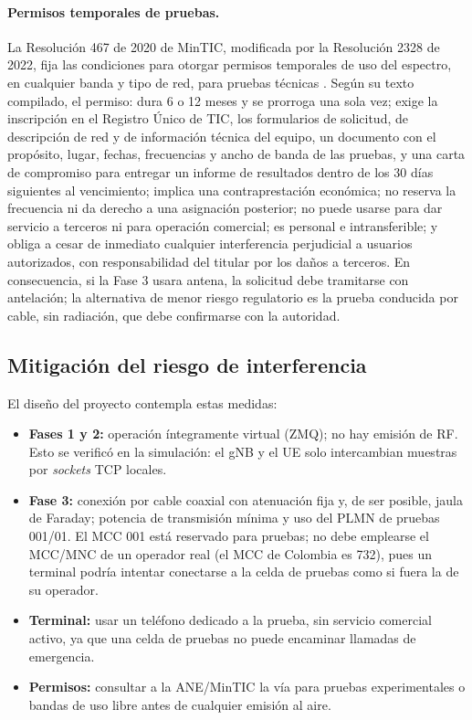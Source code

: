 \documentclass[conference]{IEEEtran}
\begin{document}
\paragraph{Permisos temporales de pruebas.} La Resolución 467 de 2020 de MinTIC, modificada por la Resolución 2328 de 2022, fija las condiciones para otorgar permisos temporales de uso del espectro, en cualquier banda y tipo de red, para pruebas técnicas \cite{res467}. Según su texto compilado, el permiso: dura 6 o 12 meses y se prorroga una sola vez; exige la inscripción en el Registro Único de TIC, los formularios de solicitud, de descripción de red y de información técnica del equipo, un documento con el propósito, lugar, fechas, frecuencias y ancho de banda de las pruebas, y una carta de compromiso para entregar un informe de resultados dentro de los 30 días siguientes al vencimiento; implica una contraprestación económica; no reserva la frecuencia ni da derecho a una asignación posterior; no puede usarse para dar servicio a terceros ni para operación comercial; es personal e intransferible; y obliga a cesar de inmediato cualquier interferencia perjudicial a usuarios autorizados, con responsabilidad del titular por los daños a terceros. En consecuencia, si la Fase 3 usara antena, la solicitud debe tramitarse con antelación; la alternativa de menor riesgo regulatorio es la prueba conducida por cable, sin radiación, que debe confirmarse con la autoridad.

\subsection{Mitigación del riesgo de interferencia}
El diseño del proyecto contempla estas medidas:
\begin{itemize}
  \item \textbf{Fases 1 y 2:} operación íntegramente virtual (ZMQ); no hay emisión de RF. Esto se verificó en la simulación: el gNB y el UE solo intercambian muestras por \textit{sockets} TCP locales.
  \item \textbf{Fase 3:} conexión por cable coaxial con atenuación fija y, de ser posible, jaula de Faraday; potencia de transmisión mínima y uso del PLMN de pruebas 001/01. El MCC 001 está reservado para pruebas; no debe emplearse el MCC/MNC de un operador real (el MCC de Colombia es 732), pues un terminal podría intentar conectarse a la celda de pruebas como si fuera la de su operador.
  \item \textbf{Terminal:} usar un teléfono dedicado a la prueba, sin servicio comercial activo, ya que una celda de pruebas no puede encaminar llamadas de emergencia.
  \item \textbf{Permisos:} consultar a la ANE/MinTIC la vía para pruebas experimentales o bandas de uso libre antes de cualquier emisión al aire.
\end{itemize}
\end{document}
